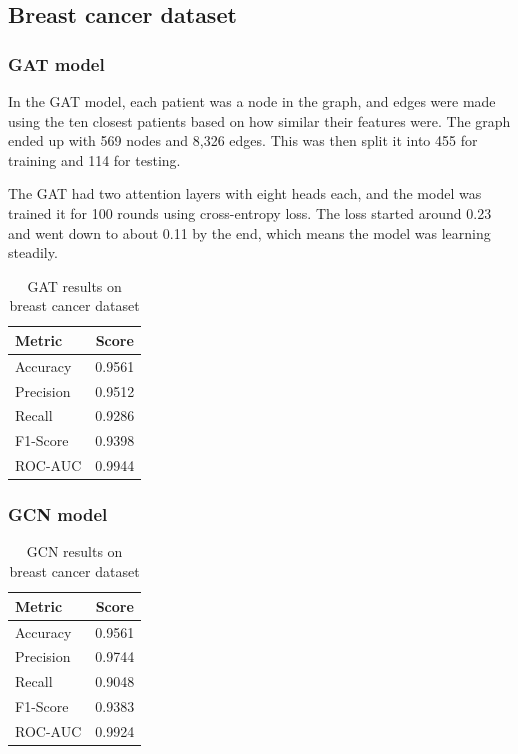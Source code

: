 \documentclass[12pt]{article}
\begin{document}
\subsection{Breast cancer dataset}
\subsubsection{GAT model}

In the GAT model, each patient was a node in the graph, and edges were made using the ten closest patients based on how similar their features were. The graph ended up with 569 nodes and 8,326 edges. This was then split it into 455 for training and 114 for testing.

The GAT had two attention layers with eight heads each, and the model was trained it for 100 rounds using cross-entropy loss. The loss started around 0.23 and went down to about 0.11 by the end, which means the model was learning steadily.

\begin{table}[H]
\centering
\caption{GAT results on breast cancer dataset}
\begin{tabular}{|l|c|}
\hline
\textbf{Metric} & \textbf{Score} \\
\hline
Accuracy  & 0.9561 \\
Precision & 0.9512 \\
Recall    & 0.9286 \\
F1-Score  & 0.9398 \\
ROC-AUC   & 0.9944 \\
\hline
\end{tabular}
\end{table}


\subsubsection{GCN model}

\begin{table}[H]
\centering
\caption{GCN results on breast cancer dataset}
\begin{tabular}{|l|c|}
\hline
\textbf{Metric} & \textbf{Score} \\
\hline
Accuracy  & 0.9561 \\
Precision & 0.9744 \\
Recall    & 0.9048 \\
F1-Score  & 0.9383 \\
ROC-AUC   & 0.9924 \\
\hline
\end{tabular}

\end{table}
\end{document}
